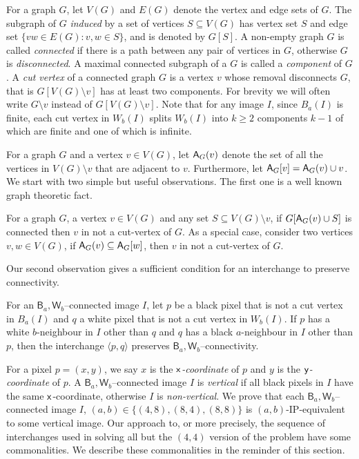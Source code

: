 \documentclass[lotsofwhite,charterfonts]{patmorin}
\newcommand{\x}{\ensuremath{\protect\textup{\textsf{x}}}}
\newcommand{\y}{\ensuremath{\protect\textup{\textsf{y}}}}
\newcommand{\ic}[2]{\langle #1,#2 \rangle}
\newcommand{\A}[2]{\ensuremath{\protect\textup{\textsf{A}}_{#2}(#1)}}
\newcommand{\AC}[2]{\ensuremath{\protect\textup{\textsf{A}}_{#2}[#1]}}
\newcommand{\sm}{\ensuremath{\setminus}}
\newcommand{\se}{\ensuremath{\subseteq}}
\begin{document}
For a graph $G$, let $V(G)$ and $E(G)$ denote the vertex and edge sets of $G$. The subgraph of $G$ \emph{induced} by a set of vertices $S\se V(G)$ has vertex set $S$ and edge set $\{vw\in E(G):v, w\in S\}$, and is denoted by $G[S]$.  A non-empty graph $G$ is called \emph{connected} if there is a path between any pair of vertices in $G$, otherwise $G$ is \emph{disconnected}. A maximal connected subgraph of a $G$ is called a \emph{component} of $G$. A \emph{cut vertex} of a connected graph $G$ is a vertex $v$ whose removal disconnects $G$, that is  $G[V(G)\sm v]$ has at least two components. For brevity we will often write $G\sm v$ instead of $G[V(G)\sm v]$. Note that for any image $I$, since $B_a(I)$ is finite, each cut vertex in $W_b(I)$ splits $W_b(I)$ into $k\geq 2$ components  $k-1$ of which are finite and one of which is infinite. 

For a graph $G$ and a vertex $v\in V(G)$, let \A{v}{G} denote the set of all the vertices in $V(G)\sm v$ that are adjacent to $v$. Furthermore, let  $\AC{v}{G}=\A{v}{G}\cup v$. We start with two simple but useful observations. The first one is a well known graph theoretic fact. 

\begin{obs}
For a graph $G$, a vertex $v\in V(G)$ and any set $S\se V(G)\sm v$, if $G[\A{v}{G}\cup S]$ is connected then $v$ in not a cut-vertex of $G$. As a special case,  consider two vertices $v, w\in V(G)$, if $\A{v}{G}\se \AC{w}{G}$, then $v$ in not a cut-vertex of $G$.
\end{obs}

Our second observation gives a sufficient condition for an interchange to preserve connectivity.

\begin{obs}
For an $\textsf{B}_a,\textsf{W}_b$--connected image $I$, let $p$ be a black pixel that is not a cut vertex in $B_a(I)$ and $q$ a white pixel that is not a cut vertex in $W_b(I)$. If $p$ has a white $b$-neighbour in $I$ other than $q$ and $q$ has a black $a$-neighbour in $I$ other than $p$, then the interchange $\ic{p}{q}$ preserves $\textsf{B}_a,\textsf{W}_b$--connectivity.
\end{obs}


For a pixel $p=(x,y)$, we say $x$ is the \emph{\x-coordinate} of $p$ and $y$ is the \emph{\y-coordinate} of $p$. A $\textsf{B}_a,\textsf{W}_b$--connected image $I$ is \emph{vertical} if all black pixels in $I$ have the same \x-coordinate, otherwise $I$ is \emph{non-vertical}. We prove that each $\textsf{B}_a,\textsf{W}_b$--connected image $I$, $(a,b)\in \{(4,8), (8,4), (8,8)\}$ is $(a,b)$-IP-equivalent to some vertical image. Our approach to, or more precisely, the sequence of interchanges used in solving  all but the $(4,4)$ version of the problem have some commonalities.  We describe these commonalities in the reminder of this section. 
\end{document}
